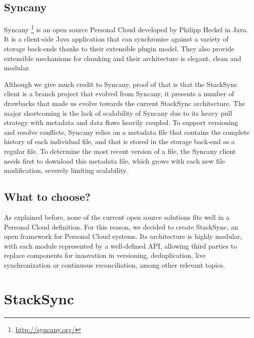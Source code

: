 \subsection{Syncany}
Syncany \footnote{\url{http://syncany.org/}} is an open source Personal Cloud developed by Philipp Heckel in Java. It is a client-side Java application that can synchronise against a variety of storage back-ends thanks to their extensible plugin model. They also provide extensible mechanisms for chunking and their architecture is elegant, clean and modular.

Although we give much credit to Syncany, proof of that is that the StackSync client is a branch project that evolved 
from Syncany, it presents a number of drawbacks that made us evolve towards the current StackSync architecture. 
The major shortcoming is the lack of scalability of Syncany due to its heavy pull strategy with metadata and
data flows heavily coupled. To support versioning and resolve conflicts, Syncany relies on a metadata file 
that contains the complete history of each individual file, and that is stored in the storage back-end
as a regular file. To determine the most recent version of a file, the Syncany client needs first to
download this metadata file, which grows with each new file modification, severely limiting scalability.

\subsection{What to choose?}
As explained before, none of the current open source solutions fits well in a Personal Cloud definition.
For this reason, we decided to create StackSync, an open framework for Personal Cloud systems. Its architecture is
highly modular, with each module represented by a well-defined API, allowing third parties to replace components
for innovation in versioning, deduplication, live synchronization or continuous reconciliation, among other
relevant topics.

\section{StackSync}



